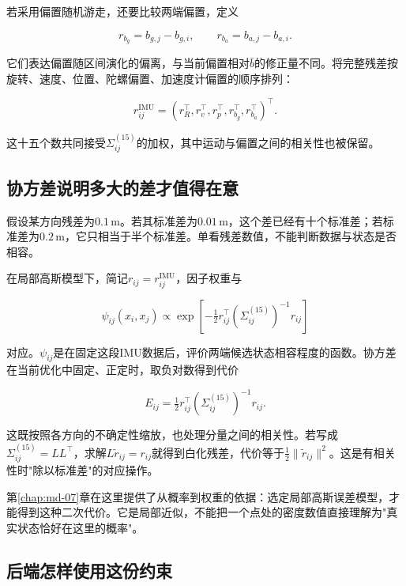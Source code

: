 若采用偏置随机游走，还要比较两端偏置，定义

\begin{equation*}
r_{b_g}=b_{g,j}-b_{g,i},\qquad r_{b_a}=b_{a,j}-b_{a,i}.
\end{equation*}

它们表达偏置随区间演化的偏离，与当前偏置相对$\bar b$的修正量不同。将完整残差按旋转、速度、位置、陀螺偏置、加速度计偏置的顺序排列：

\begin{equation*}
r_{ij}^{\mathrm{IMU}}
 =(r_R^\top,r_v^\top,r_p^\top,r_{b_g}^\top,r_{b_a}^\top)^\top.
\end{equation*}

这十五个数共同接受$\Sigma^{(15)}_{ij}$的加权，其中运动与偏置之间的相关性也被保留。

\subsection{协方差说明多大的差才值得在意}

假设某方向残差为$0.1\,\mathrm m$。若其标准差为$0.01\,\mathrm m$，这个差已经有十个标准差；若标准差为$0.2\,\mathrm m$，它只相当于半个标准差。单看残差数值，不能判断数据与状态是否相容。

在局部高斯模型下，简记$r_{ij}=r_{ij}^{\mathrm{IMU}}$，因子权重与

\begin{equation*}
\psi_{ij}(x_i,x_j)\propto
 \exp\left[-\tfrac12r_{ij}^\top(\Sigma^{(15)}_{ij})^{-1}r_{ij}\right]
\end{equation*}

对应。$\psi_{ij}$是在固定这段IMU数据后，评价两端候选状态相容程度的函数。协方差在当前优化中固定、正定时，取负对数得到代价

\begin{equation}\label{eq-intuition-factor-cost}
\boxed{E_{ij}=\tfrac12r_{ij}^\top(\Sigma^{(15)}_{ij})^{-1}r_{ij}.}
\end{equation}

这既按照各方向的不确定性缩放，也处理分量之间的相关性。若写成$\Sigma^{(15)}_{ij}=LL^\top$，求解$L\widetilde r_{ij}=r_{ij}$就得到白化残差，代价等于$\tfrac12\|\widetilde r_{ij}\|^2$。这是有相关性时"除以标准差"的对应操作。

第\ref{chap:md-07}章在这里提供了从概率到权重的依据：选定局部高斯误差模型，才能得到这种二次代价。它是局部近似，不能把一个点处的密度数值直接理解为"真实状态恰好在这里的概率"。

\subsection{后端怎样使用这份约束}

